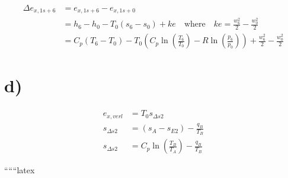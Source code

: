 \begin{align*}
    \Delta e_{x,1s+6} &= e_{x,1s+6} - e_{x,1s+0} \\
    &= h_6 - h_0 - T_0 (s_6 - s_0) + ke \quad \text{where} \quad ke = \frac{w_6^2}{2} - \frac{w_0^2}{2} \\
    &= C_p (T_6 - T_0) - T_0 \left( C_p \ln \left( \frac{T_6}{T_0} \right) - R \ln \left( \frac{p_6}{p_0} \right) \right) + \frac{w_6^2}{2} - \frac{w_0^2}{2}
\end{align*}

\section*{d)}

\begin{align*}
    e_{x,verl} &= T_0 s_{\Delta s2} \\
    s_{\Delta s2} &= (s_A - s_{E2}) - \frac{q_B}{T_B} \\
    s_{\Delta s2} &= C_p \ln \left( \frac{T_B}{T_A} \right) - \frac{q_B}{T_B}
\end{align*}

``````latex



